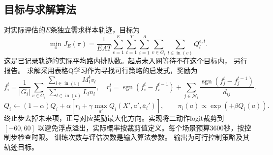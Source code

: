 \documentclass[UTF8]{ctexart}
\begin{document}
\subsection*{目标与求解算法}
对实际评估的$E$条独立需求样本轨迹，目标为
\[
\min_\pi J_E(\pi)=\frac1{EAT}\sum_{e=1}^E\sum_{t=1}^T
\sum_{i=1}^A\sum_{v\in G_i}\sum_{l\in\operatorname{in}(v)}Q_l^{e,t}.
\]
这是已记录轨迹的实际平均路内排队数。起点未入网等待不在这个目标内，
另行报告。
求解采用表格Q学习作为寻找可行策略的启发式，奖励为
\[
f_i^t=\frac1{|G_i|}\sum_{v\in G_i}
\frac{\sum_{l\in\operatorname{in}(v)}M_l^t v_l}{\sum_{l\in\operatorname{in}(v)}L_ln_l},
\quad r_i^t=\operatorname{sgn}(f_i^t-f_i^{t-1})
+\sum_{j\in\mathcal N_i}\frac{\operatorname{sgn}(f_j^t-f_j^{t-1})}{d_{ij}}.
\]
\[
Q_i\leftarrow(1-\alpha)Q_i+\alpha
\left[r_i+\gamma\max_{a'}Q_i(X',a',\bar a_i')\right],\qquad
\pi_i(a)\propto\exp(+\beta Q_i(a)).
\]
终止步去掉未来项，正号对应奖励最大化方向。实现将二动作logit裁剪到$[-60,60]$
以避免浮点溢出，实际概率按裁剪值定义。每个场景预算3600秒，按控制步检查时限。
训练次数与评估次数是输入算法参数。
输出为可行控制策略及其轨迹目标。
\end{document}
